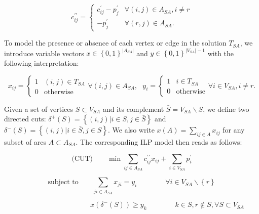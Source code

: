 \documentclass{SMBV12}
\begin{document}
\begin{equation}
c_{ij}^{\prime \prime} = 
	\begin{cases} 
		c_{ij}^{\prime} - p_j^{\prime} & \forall (i, j) \in A_{SA}, i \neq r \\ 
		- p_j^{\prime} &  \forall (r, j) \in A_{SA} .
	\end{cases}
\end{equation}

To model the presence or absence of each vertex or edge in the solution $T_{SA}$, we introduce variable vectors $x \in \left\lbrace 0, 1 \right\rbrace ^ {\lvert A_{SA} \rvert}$ and $y \in \left\lbrace 0, 1 \right\rbrace ^ {\lvert V_{SA} \rvert - 1}$ with the following interpretation:

\begin{equation}
x_{ij} = 
	\begin{cases}
		1 & (i, j) \in T_{SA}\\
		0 & \mbox{otherwise}
	\end{cases}
	\forall (i, j) \in A_{SA},\ \ \ 
y_i = 
	\begin{cases}
		1 & i \in T_{SA}\\
		0 & \mbox{otherwise}
	\end{cases}
	\forall i \in V_{SA}, i \neq r.
\end{equation}

Given a set of vertices $S \subset V_{SA}$ and its complement $\bar{S} = V_{SA} \backslash S$, we define two directed cuts: $\delta^+(S) = \left\lbrace (i, j) \lvert i \in S, j \in \bar{S} \right\rbrace $ and $\delta^-(S) = \left\lbrace (i, j) \lvert i \in \bar{S}, j \in S \right\rbrace $. We also write $x(A) = \sum\limits_{ij \in A} x_{ij}$ for any subset of arcs $A \subset A_{SA}$. The corresponding ILP model then reads as follows:

\begin{equation}
\label{eq:ilp_cut}
\mbox{(CUT)} \qquad \min \sum\limits_{ij \in A_{SA}} c_{ij}^{\prime \prime} x_{ij} + \sum\limits_{i \in V_{SA}} p_i^{\prime}
\end{equation}

\begin{equation}
\label{eq:tree}
\mbox{subject to} \qquad \sum\limits_{ji \in A_{SA}} x_{ji} = y_i \qquad \qquad \forall i \in V_{SA} \backslash \left\lbrace r \right\rbrace 
\end{equation}

\begin{equation}
\qquad \qquad \qquad \qquad \qquad x(\delta^-(S)) \geq y_k \qquad \qquad k \in S, r \notin S, \forall S \subset V_{SA}
\label{eq:connectivity}
\end{equation}
\end{document}
